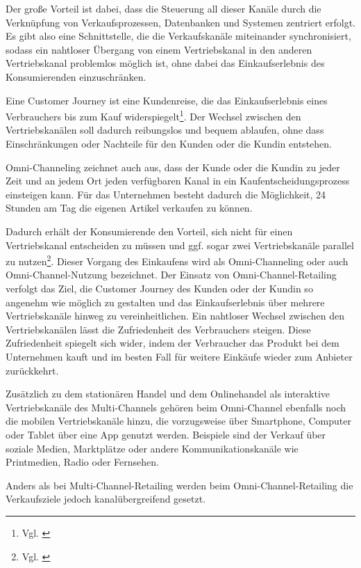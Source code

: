 Der große Vorteil ist dabei, dass die Steuerung all dieser Kanäle durch die Verknüpfung von Verkaufsprozessen, Datenbanken und Systemen zentriert erfolgt. Es gibt also eine Schnittstelle, die die Verkaufskanäle miteinander synchronisiert, sodass ein nahtloser Übergang von einem Vertriebskanal in den anderen Vertriebskanal problemlos möglich ist, ohne dabei das Einkaufserlebnis des Konsumierenden einzuschränken.
\newline

Eine Customer Journey ist eine Kundenreise, die das Einkaufserlebnis eines Verbrauchers bis zum Kauf widerspiegelt\footnote{Vgl. \autocite [S. 21] {Boeckenholt2018}}.  Der Wechsel zwischen den Vertriebskanälen soll dadurch reibungslos und bequem ablaufen, ohne dass Einschränkungen oder Nachteile für den Kunden oder die Kundin entstehen.
\newline

Omni-Channeling zeichnet auch aus, dass der Kunde oder die Kundin zu jeder Zeit und an jedem Ort jeden verfügbaren Kanal in ein Kaufentscheidungsprozess einsteigen kann. Für das Unternehmen besteht dadurch die Möglichkeit, 24 Stunden am Tag die eigenen Artikel verkaufen zu können.
\newline

Dadurch erhält der Konsumierende den Vorteil, sich nicht für einen Vertriebskanal entscheiden zu müssen und ggf. sogar zwei Vertriebskanäle parallel zu nutzen\footnote{Vgl. \autocite [S. 20] {Heinemann2013}}.
Dieser Vorgang des Einkaufens wird als Omni-Channeling oder auch Omni-Channel-Nutzung bezeichnet. Der Einsatz von Omni-Channel-Retailing verfolgt das Ziel, die Customer Journey des Kunden oder der Kundin so angenehm wie möglich zu gestalten und das Einkaufserlebnis über mehrere Vertriebskanäle hinweg zu vereinheitlichen. Ein nahtloser Wechsel zwischen den Vertriebskanälen lässt die Zufriedenheit des Verbrauchers steigen. Diese Zufriedenheit spiegelt sich wider, indem der Verbraucher das Produkt bei dem Unternehmen kauft und im besten Fall für weitere Einkäufe wieder zum Anbieter zurückkehrt.
\newline

Zusätzlich zu dem stationären Handel und dem Onlinehandel als interaktive Vertriebskanäle des Multi-Channels gehören beim Omni-Channel ebenfalls noch die mobilen Vertriebskanäle hinzu, die vorzugsweise über Smartphone, Computer oder Tablet über eine App genutzt werden. Beispiele sind der Verkauf über soziale Medien, Marktplätze oder andere Kommunikationskanäle wie Printmedien, Radio oder Fernsehen.
\newline

Anders als bei Multi-Channel-Retailing werden beim Omni-Channel-Retailing die Verkaufsziele jedoch kanalübergreifend gesetzt.